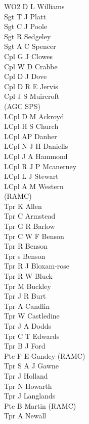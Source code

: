 \begin{multicols}{3}
  \small
  \noindent
  WO2 D L Williams \\
  Sgt T J Platt \\
  Sgt C J Poole \\
  Sgt R Sedgeley \\
  Sgt A C Spencer \\
  Cpl G J Clowes \\
  Cpl W D Crabbe \\
  Cpl D J Dove \\
  Cpl D R E Jervis \\
  Cpl J S Muircroft \\ \indent  (AGC SPS) \\
  LCpl D M Ackroyd \\
  LCpl H S Church \\
  LCpl AP Danher \\
  LCpl N J H Daniells \\
  LCpl J A Hammond \\
  LCpl R J P Mcanerney \\
  LCpl L J Stewart \\
  LCpl A M Western \\ \indent  (RAMC) \\
  Tpr K Allen \\
  Tpr C Armstead \\
  Tpr G R Barlow \\
  Tpr C W F Benson \\
  Tpr R Benson \\
  Tpr s Benson \\
  Tpr R J Bloxam-rose \\
  Tpr R W Bluck \\
  Tpr M Buckley \\
  Tpr J R Burt \\
  Tpr A Candlin \\
  Tpr W Castledine \\
  Tpr J A Dodds \\
  Tpr C T Edwards \\
  Tpr B J Ford \\
  Pte F E Gandey (RAMC) \\
  Tpr S A J Gawne \\
  Tpr J Holland \\
  Tpr N Howarth \\
  Tpr J Langlands \\
  Pte B Martin (RAMC) \\
  Tpr A Newall \\

\end{multicols}
